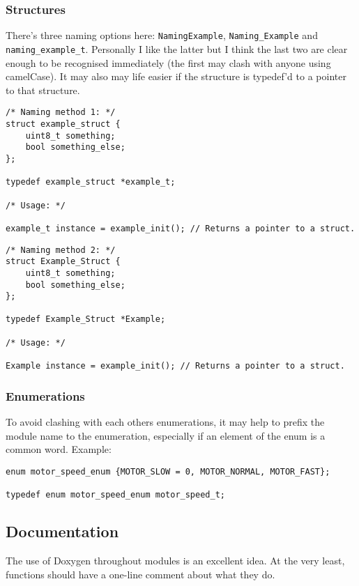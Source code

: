 \documentclass[10pt]{article}
\begin{document}
\subsubsection{Structures}
There's three naming options here: \texttt{NamingExample}, \texttt{Naming\_Example} and \texttt{naming\_example\_t}. Personally I like the latter but I think the last two are clear enough to be recognised immediately (the first may clash with anyone using camelCase). It may also may life easier if the structure is typedef'd to a pointer to that structure.

\begin{lstlisting}[frame=single]
/* Naming method 1: */
struct example_struct {
	uint8_t something;
	bool something_else;
};

typedef example_struct *example_t;

/* Usage: */

example_t instance = example_init(); // Returns a pointer to a struct.
\end{lstlisting}
\begin{lstlisting}[frame=single]
/* Naming method 2: */
struct Example_Struct {
	uint8_t something;
	bool something_else;
};

typedef Example_Struct *Example;

/* Usage: */

Example instance = example_init(); // Returns a pointer to a struct.
\end{lstlisting}

\subsubsection{Enumerations}
To avoid clashing with each others enumerations, it may help to prefix the module name to the enumeration, especially if an element of the enum is a common word. Example:
\begin{lstlisting}[frame=single]
enum motor_speed_enum {MOTOR_SLOW = 0, MOTOR_NORMAL, MOTOR_FAST};

typedef enum motor_speed_enum motor_speed_t;
\end{lstlisting}

\subsection{Documentation}
The use of Doxygen throughout modules is an excellent idea. At the very least, functions should have a one-line comment about what they do. 
\end{document}
